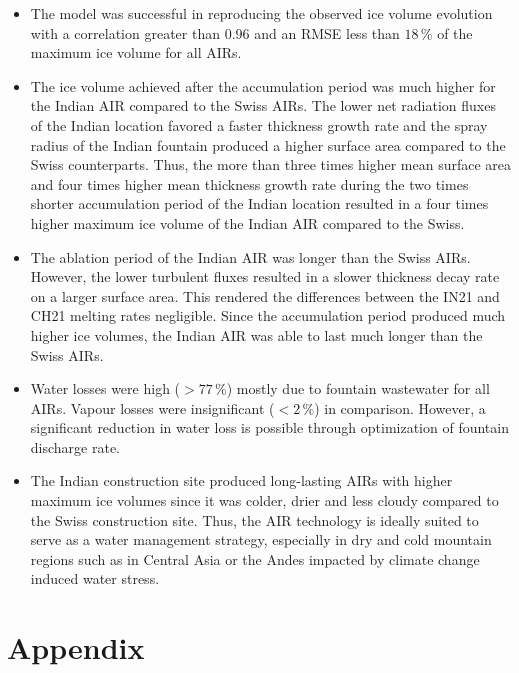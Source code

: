 \documentclass[utf8]{frontiersSCNS}
\begin{document}
\begin{itemize}
	\item The model was successful in reproducing the observed ice volume evolution with a correlation greater
	      than $0.96$ and an RMSE less than $18 \, \%$ of the maximum ice volume for all AIRs.

	\item The ice volume achieved after the accumulation period was much higher for the Indian AIR compared to the
	      Swiss AIRs. The lower net radiation fluxes of the Indian location favored a faster thickness growth rate and the
	      spray radius of the Indian fountain produced a higher surface area compared to the Swiss counterparts. Thus,
        the more than three times higher mean surface area and four times higher mean thickness growth rate
        during the two times shorter accumulation period of the Indian location resulted in a four times higher
        maximum ice volume of the Indian AIR compared to the Swiss.

	\item The ablation period of the Indian AIR was longer than the Swiss AIRs. However, the lower turbulent fluxes resulted in
	      a slower thickness decay rate on a larger surface area. This rendered the differences between the IN21 and CH21
	      melting rates negligible. Since the accumulation period produced much higher ice volumes, the Indian AIR was
	      able to last much longer than the Swiss AIRs.

  \item Water losses were high ($>77\,\%$) mostly due to fountain wastewater for all AIRs. Vapour losses
    were insignificant ($<2\,\%$) in comparison. However, a significant reduction in water loss is possible
    through optimization of fountain discharge rate.

  \item The Indian construction site produced long-lasting AIRs with higher maximum ice volumes since it was
    colder, drier and less cloudy compared to the Swiss construction site. Thus, the AIR technology is ideally
    suited to serve as a water management strategy, especially in dry and cold mountain regions such as in
    Central Asia or the Andes impacted by climate change induced water stress.

\end{itemize}

\section{Appendix}
\end{document}
